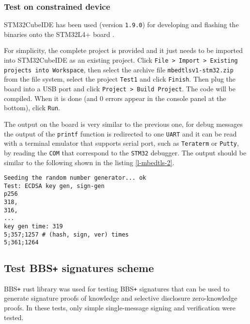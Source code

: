 \subsubsection{Test on constrained device}
STM32CubeIDE \cite{cube-ide} has been used (version \texttt{1.9.0}) for developing and flashing the binaries onto the STM32L4+ board \cite{stm32-board-product}.

For simplicity, the complete project is provided and it just needs to be imported into STM32CubeIDE as an existing project. Click \texttt{File > Import > Existing projects into Workspace}, then select the archive file \texttt{mbedtlsv1-stm32.zip} from the file system, select the project \texttt{Test1} and click \texttt{Finish}. Then plug the board into a USB port and click \texttt{Project > Build Project}. The code will be compiled. When it is done (and 0 errors appear in the console panel at the bottom), click \texttt{Run}. 

The output on the board is very similar to the previous one, for debug messages the output of the \texttt{printf} function is redirected to one \texttt{UART} and it can be read with a terminal emulator that supports serial port, such as \texttt{Teraterm} or \texttt{Putty}, by reading the \texttt{COM} that correspond to the \texttt{STM32} debugger. 
The output should be similar to the following shown in the listing \ref{l-mbedtls-2}. \\

\begin{lstlisting}[caption={Example of MbedTLS tests output on constrained device},captionpos=b,label={l-mbedtls-2},style=DOS,frame=single]
Seeding the random number generator... ok
Test: ECDSA key gen, sign-gen
p256
318,
316,
...
key gen time: 319
5;357;1257 # (hash, sign, ver) times
5;361;1264
\end{lstlisting}




\subsection{Test BBS\texttt{+} signatures scheme}
BBS\texttt{+} rust library was used for testing BBS\texttt{+} signatures that can be used to generate signature proofs of knowledge and selective disclosure zero-knowledge proofs. In these tests, only simple single-message signing and verification were tested.

